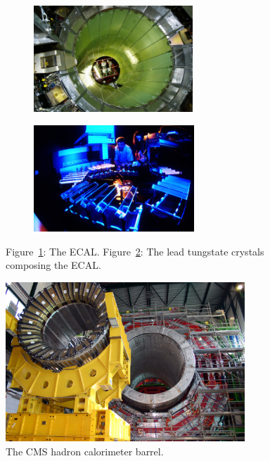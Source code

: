 	\begin{figure}[H]
		\begin{subfigure}{0.5\linewidth}
			\centering
			\includegraphics[height = 4cm]{fig/chapt2/ECAL_barrel.jpg}
			\caption{\label{fig:ECAL:A}}
		\end{subfigure}
		\begin{subfigure}{0.5\linewidth}
			\centering
			\includegraphics[height = 4cm]{fig/chapt2/ECAL_crystals.jpg}
			\caption{\label{fig:ECAL:B}}
		\end{subfigure}
		\caption{\label{fig:ECAL} Figure~\ref{fig:ECAL:A}: The \acl{ECAL}. Figure~\ref{fig:ECAL:B}: The lead tungstate crystals composing the ECAL.}
	\end{figure}
	
	\begin{figure}[H]
		\centering
		\includegraphics[height = 6cm]{fig/chapt2/HCAL.jpg}
		\caption{\label{fig:HCAL} The CMS hadron calorimeter barrel.}
	\end{figure}
	
